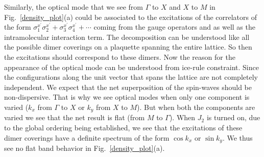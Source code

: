 \indent Similarly, the optical mode that we see from $\Gamma$ to $X$ and $X$ to $M$ in Fig.~\ref{density_plot}(a) could be associated to the excitations of the correlators of the form $\sigma^{x^\prime}_1\sigma^{x^\prime}_2+\sigma^{x^\prime}_3\sigma^{x^\prime}_4+\cdots$ coming from the gauge operators and as well as the intramolecular interaction term. The decomposition can be understood like all the possible dimer coverings on a plaquette spanning the entire lattice. So then the excitations should correspond to these dimers. Now the reason for the appearance of the optical mode can be understood from ice-rule constraint. Since the configurations along the unit vector that spans the lattice are not completely independent. We expect that the net superposition of the spin-waves should be non-dispersive. That is why we see optical modes when only one component is varied ($k_x$ from $\Gamma$ to $X$ or $k_y$ from $X$ to $M$). But when both the components are varied we see that the net result is flat (from $M$ to $\Gamma$). When $J_2$ is turned on, due to the global ordering being established, we see that the excitations of these dimer coverings have a definite spectrum of the form $\cos k_x$ or $\sin k_y$. We thus see no flat band behavior in Fig.~\ref{density_plot}(a). \\
